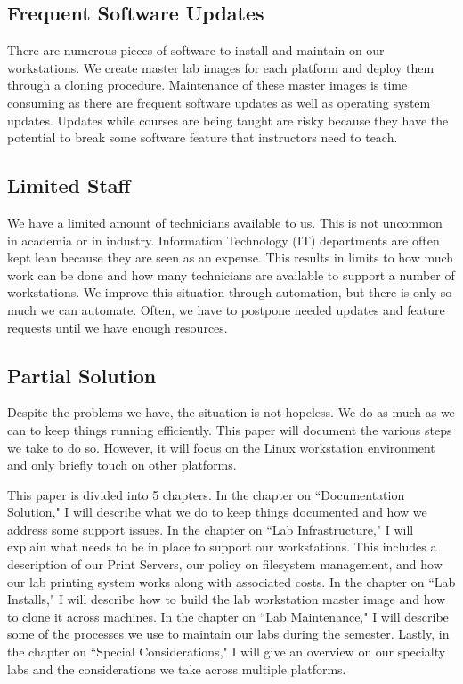 \subsection{Frequent Software Updates}

There are numerous pieces of software to install and maintain on our workstations.  We create master lab images for each platform and deploy them through a cloning procedure.  Maintenance of these master images is time consuming as there are frequent software updates as well as operating system updates.  Updates while courses are being taught are risky because they have the potential to break some software feature that instructors need to teach. 

\subsection{Limited Staff}

We have a limited amount of technicians available to us.  This is not uncommon in academia or in industry.  Information Technology (IT) departments are often kept lean because they are seen as an expense.  This results in limits to how much work can be done and how many technicians are available to support a number of workstations.  We improve this situation through automation, but there is only so much we can automate.  Often, we have to postpone needed updates and feature requests until we have enough resources.

\subsection{Partial Solution}
Despite the problems we have, the situation is not hopeless.  We do as much as we can to keep things running efficiently.  This paper will document the various steps we take to do so.  However, it will focus on the Linux workstation environment and only briefly touch on other platforms.  

This paper is divided into 5 chapters.  In the chapter on ``Documentation Solution," I will describe what we do to keep things documented and how we address some support issues.  In the chapter on ``Lab Infrastructure," I will explain what needs to be in place to support our workstations.  This includes a description of our Print Servers, our policy on filesystem management, and how our lab printing system works along with associated costs.  In the chapter on ``Lab Installs," I will describe how to build the lab workstation master image and how to clone it across machines.  In the chapter on ``Lab Maintenance," I will describe some of the processes we use to maintain our labs during the semester.  Lastly, in the chapter on ``Special Considerations," I will give an overview on our specialty labs and the considerations we take across multiple platforms.  

